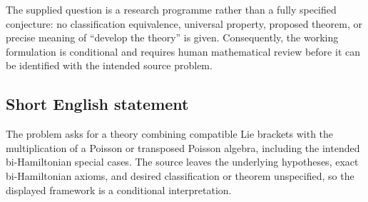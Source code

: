 \documentclass[11pt]{article}
\begin{document}
The supplied question is a research programme rather than a fully specified conjecture: no classification equivalence, universal property, proposed theorem, or precise meaning of ``develop the theory'' is given. Consequently, the working formulation is conditional and requires human mathematical review before it can be identified with the intended source problem.
\subsection{Short English statement}
The problem asks for a theory combining compatible Lie brackets with the multiplication of a Poisson or transposed Poisson algebra, including the intended bi-Hamiltonian special cases. The source leaves the underlying hypotheses, exact bi-Hamiltonian axioms, and desired classification or theorem unspecified, so the displayed framework is a conditional interpretation.
\end{document}
